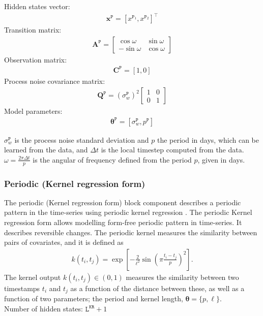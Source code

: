 Hidden states vector: 
\begin{gather*}
\mathbf{x}^{\mathtt{P}} = [x^{\mathtt{P}_ {1}}, x^{\mathtt{P}_{2}}]^{\intercal}
\end{gather*}
Transition matrix: 
\begin{gather*}
\mathbf{A}^{\mathtt{P}}= \left[\begin{array}{cc}\cos \omega &\sin \omega\\-\sin \omega&\cos \omega\end{array}\right]
\end{gather*}
Observation matrix: 
\begin{gather*}
\mathbf{C}^{\mathtt{P}}=[1, 0]
\end{gather*}
Process noise covariance matrix:
\begin{gather*}
\mathbf{Q}^{\mathtt{P}}=(\sigma_{w}^{\mathtt{P}})^{2}\left[\begin{array}{cc}1 &0\\0&1\end{array}\right]
\end{gather*}
Model parameters: 
\begin{gather*}
\bm\theta^{\mathtt{P}}=[\sigma_{w}^{\mathtt{P}}, p^{\mathtt{P}} ]
\end{gather*}

\noindent
$\sigma_{w}^{\mathtt{P}}$ is the process noise standard deviation and $p$ the period in days, which can be learned from the data, and $\Delta t$ is the local timestep computed from the data.
 $\omega=\frac{2\pi \Delta t}{p}$ is the angular of frequency defined from the period $p$, given in days.


\subsubsection{Periodic (Kernel regression form)}

The periodic (Kernel regression form) block component describes a periodic pattern in the time-series using periodic kernel regression  \cite{Nguyen2019KRBDLM}. 
The periodic Kernel regression form allows modelling form-free periodic pattern in time-series.
It describes reversible changes.
The periodic kernel measures the similarity between pairs of covariates, and it is defined as
\begin{gather*}
k(t_{i},t_{j})=\exp\left[-\frac{2}{\ell^2}\sin\left( \pi\frac{t_i-t_{j}}{p}\right)^{2}\right].
\end{gather*}
The kernel output $k(t_{i},t_{j})\in(0,1)$ measures the similarity between two timestamps $t_{i}$ and $t_{j}$ as a function of the distance between these, as well as a function of two parameters; the period and kernel length, $\bm{\theta}=\{p,\ell\}$.
\noindent\\
Number of hidden states:  $\mathtt{L}^{\mathtt{KR}}+1$\\

